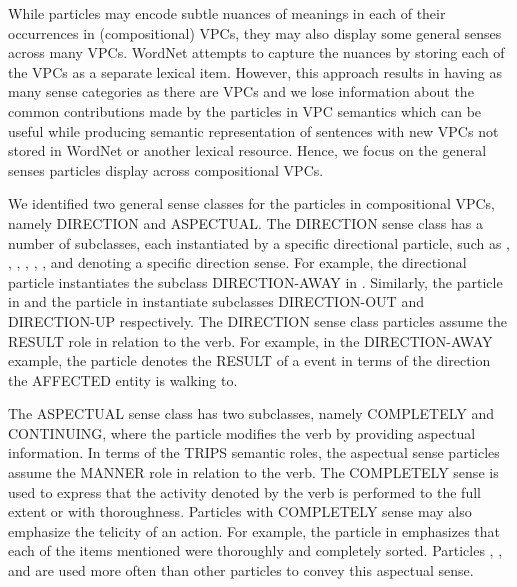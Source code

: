 \documentclass[output=paper,modfonts,nonflat]{langsci/langscibook}
\begin{document}
While particles may encode subtle nuances of meanings in each of their occurrences in (compositional) VPCs, they may also display some general senses across many VPCs. WordNet attempts to capture the nuances by storing each of the VPCs as a separate lexical item. However, this approach results in having as many sense categories as there are VPCs and we lose information about the common contributions made by the particles in VPC semantics which can be useful while producing semantic representation of sentences with new VPCs not stored in WordNet or another lexical resource. Hence, we focus on the general senses particles display across compositional VPCs. 

We identified two general sense classes for the particles in compositional VPCs, namely DIRECTION and ASPECTUAL. The DIRECTION sense class has a number of subclasses, each instantiated by a specific directional particle, such as , , , , , , and  denoting a specific direction sense. For example, the directional particle  instantiates the subclass DIRECTION-AWAY in . Similarly, the particle  in  and the particle  in  instantiate subclasses DIRECTION-OUT and DIRECTION-UP respectively. The DIRECTION sense class particles assume the RESULT role in relation to the verb. For example, in the DIRECTION-AWAY example, the particle  denotes the RESULT of a  event in terms of the direction the AFFECTED entity is walking to.

The ASPECTUAL sense class has two subclasses, namely COMPLETELY and CONTINUING, where the particle modifies the verb by providing aspectual information. In terms of the TRIPS semantic roles, the aspectual sense particles assume the MANNER role in relation to the verb. The COMPLETELY sense is used to express that the activity denoted by the verb is performed to the full extent or with thoroughness. Particles with COMPLETELY sense may also emphasize the telicity of an action. For example, the particle  in  emphasizes that each of the items mentioned were thoroughly and completely sorted. Particles , , and  are used more often than other particles to convey this aspectual sense.
\end{document}
